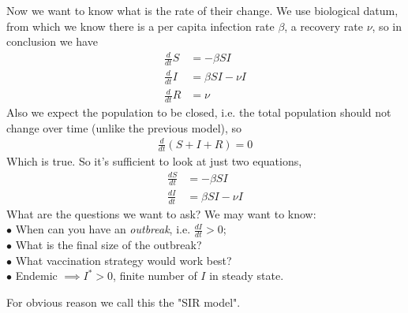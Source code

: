 \documentclass[a4paper]{article}
\begin{document}
Now we want to know what is the rate of their change. We use biological datum, from which we know there is a per capita infection rate $\beta$, a recovery rate $\nu$, so in conclusion we have
\begin{equation*}
\begin{aligned}
\frac{d}{dt} S &= -\beta SI\\
\frac{d}{dt} I &= \beta SI - \nu I\\
\frac{d}{dt} R &= \nu 
\end{aligned}
\end{equation*}
Also we expect the population to be closed, i.e. the total population should not change over time (unlike the previous model), so 
\begin{equation*}
\begin{aligned}
\frac{d}{dt}(S+I+R) = 0
\end{aligned}
\end{equation*}
Which is true. So it's sufficient to look at just two equations,
\begin{equation*}
\begin{aligned}
\frac{dS}{dt} &= -\beta SI\\
\frac{dI}{dt} &= \beta SI - \nu I
\end{aligned}
\end{equation*}
What are the questions we want to ask? We may want to know:\\
$\bullet$ When can you have an \emph{outbreak}, i.e. $\frac{dI}{dt}>0$;\\
$\bullet$ What is the final size of the outbreak?\\
$\bullet$ What vaccination strategy would work best?\\
$\bullet$ Endemic $\implies I^*>0$, finite number of $I$ in steady state.

For obvious reason we call this the "SIR model".
\end{document}
